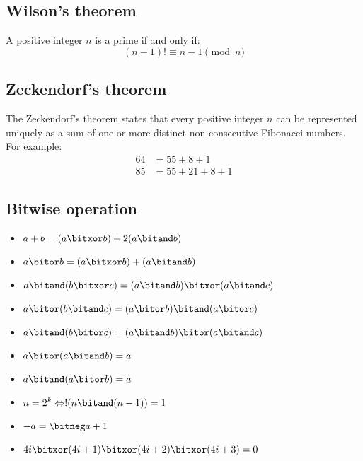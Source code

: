\subsection{Wilson's theorem}
A positive integer $n$ is a prime if and only if:
\[ (n - 1)! \equiv n - 1 \pmod n \]

\subsection{Zeckendorf’s theorem}
The Zeckendorf's theorem states that every positive integer $n$ can be represented uniquely as a sum of one or more 
distinct non-consecutive Fibonacci numbers. For example:
	\vspace{-0.45cm}
	\begin{align*}
		64 &= 55 + 8 + 1 \\ 
		85 &= 55 + 21 + 8 + 1
	\end{align*}
	\vspace{-0.45cm}

\subsection{Bitwise operation}
\begin{multicols}{2}
\vspace{-\topsep}
\begin{itemize}
  	\setlength{\parskip}{0pt}
 	\setlength{\itemsep}{0pt plus 1pt}
	\item $a + b = (a \bitxor b) + 2(a \bitand b)$
	\item $a \bitor b = (a \bitxor b) + (a \bitand b)$
	\item $a \bitand (b \bitxor c) = (a \bitand b) \bitxor (a \bitand c)$
	\item $a \bitor (b \bitand c) = (a \bitor b) \bitand (a \bitor c)$
	\item $a \bitand (b \bitor c) = (a \bitand b) \bitor (a \bitand c)$
	\item $a \bitor (a \bitand b) = a$
	\item $a \bitand (a \bitor b) = a$
	\item $n = 2^{k} \Leftrightarrow !(n \bitand (n - 1)) = 1$
	\item $-a = \bitneg a + 1$
	\item $4i \bitxor (4i + 1) \bitxor (4i + 2) \bitxor (4i + 3) = 0$
\end{itemize}
\vspace{-\topsep}
\end{multicols}

